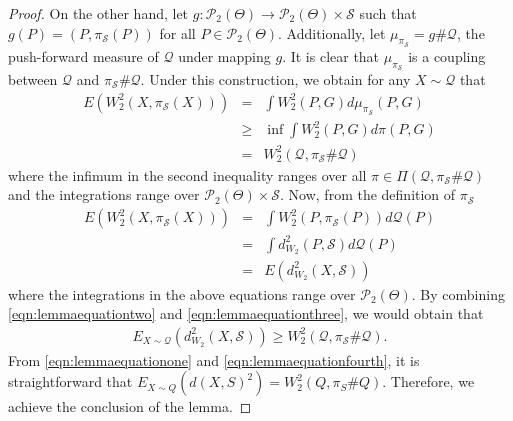 \begin{proof}
On the other hand, let ${\displaystyle g:\mathcal{P}_{2}(\Theta)  \to \mathcal{P}_{2}(\Theta) \times \mathcal{S}}$ 
such that $g(P)=(P,\pi_{\mathcal{S}}(P))$ for all $P \in \mathcal{P}_{2}(\Theta)$. Additionally, let 
$\mu _{\pi _\mathcal{S} } = g \# \mathcal{Q}$, the push-forward measure of $\mathcal{Q}$ under mapping $g$. It is clear that $\mu _{\pi _\mathcal{S}}$ is a coupling between $\mathcal{Q}$ and $\pi _\mathcal{S} \# \mathcal{Q}$. 
Under this construction, we obtain for any $X \sim \mathcal{Q}$ that
\begin{eqnarray}
 E\left(W_{2}^{2}(X,\pi _\mathcal{S} (X))\right) & = & \int {W_{2}^{2}(P,G) } d\mu _{\pi _\mathcal{S}} (P,G) \nonumber \\
 & \geq & \mathop {\inf } \int {W_{2}^{2}(P,G)} d\pi (P,G) \nonumber \\
& = & W_2^2 (\mathcal{Q},\pi _\mathcal{S} \# \mathcal{Q}) \label{eqn:lemmaequationtwo}
\end{eqnarray}
where the infimum in the second inequality ranges over all $\pi  \in \Pi (\mathcal{Q},\pi _\mathcal{S} \# \mathcal{Q})$ and the integrations range over $\mathcal{P}_{2}(\Theta) \times \mathcal{S}$. Now, from the definition of $\pi_{\mathcal{S}}$
\begin{eqnarray}
E(W_{2}^{2}(X,\pi _\mathcal{S} (X))) & = & \int {W_{2}^{2}(P,\pi _\mathcal{S}(P))}d\mathcal{Q}(P) \nonumber \\
& = & \int {d_{W_{2}}^{2}(P,\mathcal{S})} d\mathcal{Q}(P) \nonumber \\
& = & E(d_{W_{2}}^{2}(X,\mathcal{S})) \label{eqn:lemmaequationthree}
\end{eqnarray}
where the integrations in the above equations range over $\mathcal{P}_{2}(\Theta)$. By combining \eqref{eqn:lemmaequationtwo} and \eqref{eqn:lemmaequationthree}, we would obtain that
\begin{eqnarray}
E_{X \sim \mathcal{Q}} (d^{2}_{W_{2}}(X,\mathcal{S})) \ge W_2^2 (\mathcal{Q},\pi _\mathcal{S} \# \mathcal{Q}). \label{eqn:lemmaequationfourth}
\end{eqnarray}
From \eqref{eqn:lemmaequationone} and \eqref{eqn:lemmaequationfourth}, it is straightforward that $E_{X \sim Q} (d(X,S)^2 ) = W_2^2 (Q,\pi _S  \# Q)$. Therefore, we achieve the conclusion of the lemma.
\end{proof}

